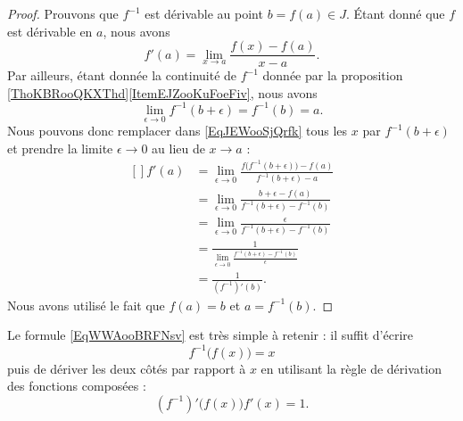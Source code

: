 \begin{proof}
    Prouvons que \( f^{-1}\) est dérivable au point \( b=f(a)\in J\). Étant donné que \( f\) est dérivable en \( a\), nous avons
    \begin{equation}\label{EqJEWooSjQrfk}
        f'(a)=\lim_{x\to a} \frac{ f(x)-f(a) }{ x-a }.
    \end{equation}
    Par ailleurs, étant donnée la continuité de \( f^{-1}\) donnée par la proposition \ref{ThoKBRooQKXThd}\ref{ItemEJZooKuFoeFiv}, nous avons
    \begin{equation}
        \lim_{\epsilon\to 0} f^{-1}(b+\epsilon)=f^{-1}(b)=a.
    \end{equation}
    Nous pouvons donc remplacer dans \eqref{EqJEWooSjQrfk} tous les \( x\) par \( f^{-1}(b+\epsilon)\) et prendre la limite \( \epsilon\to 0\) au lieu de \( x\to a\) :
    \begin{equation}
        \begin{aligned}[]
            f'(a)&=\lim_{\epsilon\to 0}\frac{ f\big( f^{-1}(b+\epsilon) \big)-f(a) }{ f^{-1}(b+\epsilon)-a }\\
            &=\lim_{\epsilon\to 0}\frac{ b+\epsilon-f(a) }{ f^{-1}(b+\epsilon)-f^{-1}(b) }\\
            &=\lim_{\epsilon\to 0}\frac{ \epsilon }{ f^{-1}(b+\epsilon)-f^{-1}(b) }\\
            &=\frac{1}{ \lim_{\epsilon\to 0}\frac{ f^{-1}(b+\epsilon)-f^{-1}(b) }{ \epsilon } }\\
            &=\frac{1}{ (f^{-1})'(b) }.
        \end{aligned}
    \end{equation}
    Nous avons utilisé le fait que \( f(a)=b\) et \( a=f^{-1}(b)\).
\end{proof}

\begin{remark}
    Le formule \eqref{EqWWAooBRFNsv} est très simple à retenir : il suffit d'écrire
    \begin{equation}    
        f^{-1}\big( f(x) \big)=x
    \end{equation}
    puis de dériver les deux côtés par rapport à \( x\) en utilisant la règle de dérivation des fonctions composées :
    \begin{equation}
        (f^{-1})'\big( f(x) \big)f'(x)=1.
    \end{equation}
\end{remark}

